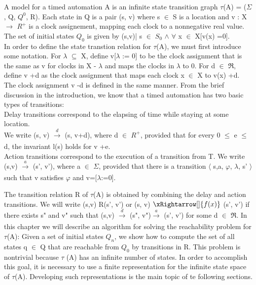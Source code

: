 A model for a timed automation A is an infinite state transition graph $\tau$(A) = ($\Sigma$, Q, $Q^{0}$, R). Each state in Q is a pair (s, v) where s $\in$ S is a location and v : X $\rightarrow$  $R^{+}$ is a clock assignement, mapping each clock to a nonnegative real value. The set of initial states $Q_0$ is given by {(s,v)| s $\in$ $S_0$ $\wedge$ $\forall$ x  $\in$  X[v(x) =0]}. \\
\newline
In order to define the state transtion relation for $\tau$(A), we must first introduce some notation. For $\lambda$ $\subseteq$ X, define v[$\lambda$ := 0] to be the clock assignment that is the same as v for clocks in X - $\lambda$ and maps the clocks in $\lambda$ to 0. For d $\in$ $\Re$, define v +d as the clock assignment that maps each clock x $\in$ X to v(x) +d. The clock assignment v -d is defined in the same  manner.
From the brief discussion in the introduction, we know that a timed automation has two basic types of transitions: \\
\newline
Delay transitions correspond to the elapsing of time while staying at some location. \\ \newline 
We write (s, v) $\xrightarrow[]{d}$ (s, v+d), where d $\in$  $R^{+}$, provided that for every 0 $\leq$ e $\leq$ d, the invariant	l(s) holds for v +e. \\
\newline
Action transitions correspond to the execution of a transition	 from T. We write (s,v) $\xrightarrow[]{a}$ (s', v'), where a $\in$ $\Sigma$, provided that there is a transition $\langle$ s,a, $\varphi$, $\lambda$, s' $\rangle$ such that v satisfies $\varphi$ and v=[$\lambda$:=0]. \\ 
\newline

The transition relation R of $\tau$(A) is obtained by combining the delay and action transitions. We will write (s,v) R(s', v') or (s, v) $\xRightarrow[]{f(x)}$   (s', v') if there exists s" and v" such that (s,v) $\xrightarrow[]{d}$ (s", v")$\xrightarrow[]{a}$ (s', v') for some d $\in$ $\Re$.
In this chapter we will describe an algorithm for solving the reachability problem for $\tau$(A): Given a set of initial states $Q_n$, we show how to compute the set of all states q $\in$ Q that are reachable from $Q_0$ by transitions in R. This problem is nontrivial because $\tau$ (A) has an infinite number of states. In order to accomplish this goal, it is necessary to use a finite representation for the infinite state space of $\tau$(A). Developing such representations is the main topic of te following sections.

